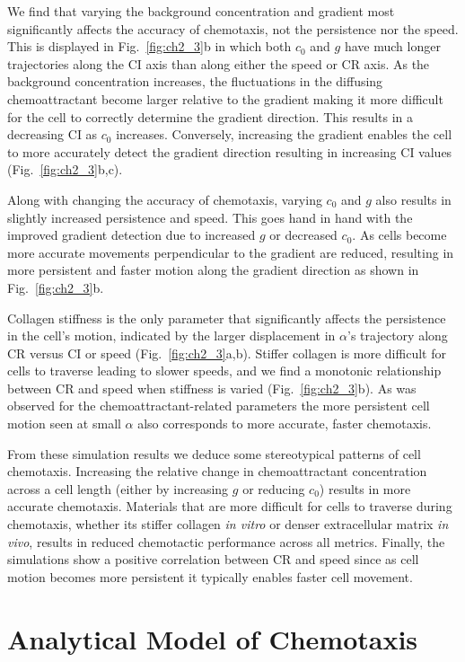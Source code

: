 We find that varying the background concentration and gradient most significantly affects the accuracy of chemotaxis, not the persistence nor the speed. This is displayed in Fig.\ \ref{fig:ch2_3}b in which both $c_0$ and $g$ have much longer trajectories along the CI axis than along either the speed or CR axis.
As the background concentration increases, the fluctuations in the diffusing chemoattractant become larger relative to the gradient making it more difficult for the cell to correctly determine the gradient direction. This results in a decreasing CI as $c_0$ increases. Conversely, increasing the gradient enables the cell to more accurately detect the gradient direction resulting in increasing CI values (Fig.\ \ref{fig:ch2_3}b,c).

Along with changing the accuracy of chemotaxis, varying $c_0$ and $g$ also results in slightly increased persistence and speed. This goes hand in hand with the improved gradient detection due to increased $g$ or decreased $c_0$. As cells become more accurate movements perpendicular to the gradient are reduced, resulting in more persistent and faster motion along the gradient direction as shown in Fig.\ \ref{fig:ch2_3}b.

Collagen stiffness is the only parameter that significantly affects the persistence in the cell's motion, indicated by the larger displacement in $\alpha$'s trajectory along CR versus CI or speed (Fig.\ \ref{fig:ch2_3}a,b). Stiffer collagen is more difficult for cells to traverse leading to slower speeds, and we find a monotonic relationship between CR and speed when stiffness is varied (Fig.\ \ref{fig:ch2_3}b). As was observed for the chemoattractant-related parameters the more persistent cell motion seen at small $\alpha$ also corresponds to more accurate, faster chemotaxis.

From these simulation results we deduce some stereotypical patterns of cell chemotaxis. Increasing the relative change in chemoattractant concentration across a cell length (either by increasing $g$ or reducing $c_0$) results in more accurate chemotaxis. Materials that are more difficult for cells to traverse during chemotaxis, whether its stiffer collagen \textit{in vitro} or denser extracellular matrix \textit{in vivo}, results in reduced chemotactic performance across all metrics. Finally, the simulations show a positive correlation between CR and speed since as cell motion becomes more persistent it typically enables faster cell movement.

\section{Analytical Model of Chemotaxis}

